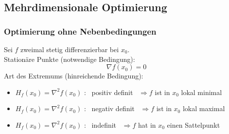 \subsection{Mehrdimensionale Optimierung} %
\label{sub:mehrdimensionale_optimierung}

\subsubsection{Optimierung ohne Nebenbedingungen} %
\label{ssub:optimierung_ohne_nebenbedingungen}
Sei $f$ zweimal stetig differenzierbar bei $x_0$.
\\Stationäre Punkte (notwendige Bedingung):
\begin{equation}
	\nabla f (x_0) = 0
\end{equation}
Art des Extremums (hinreichende Bedingung):

\begin{itemize}
	\item $H_f(x_0) = \nabla^2f(x_0)$ : \ positiv definit \  $\Rightarrow f $ ist in $ x_0 $ lokal minimal
	\item $H_f(x_0) = \nabla^2f(x_0)$ : \ negativ definit \  $\Rightarrow f $ ist in $ x_0 $ lokal maximal
	\item $H_f(x_0) = \nabla^2f(x_0)$ : \ indefinit \ $\Rightarrow f $ hat in $ x_0 $ einen Sattelpunkt
\end{itemize}
